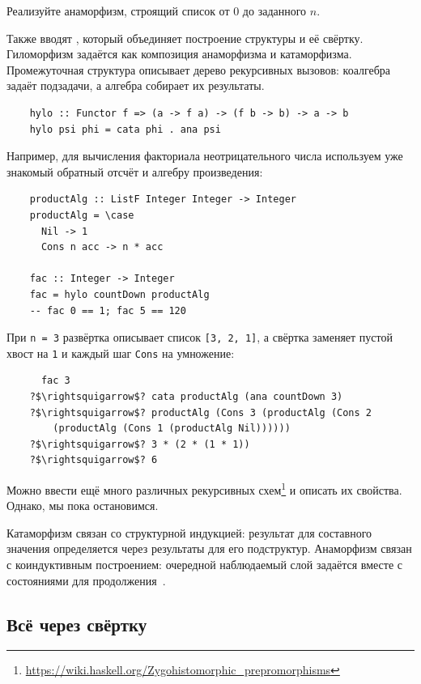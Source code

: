 \begin{task}
    Реализуйте анаморфизм, строящий список от $0$ до заданного $n$.
\end{task}

Также вводят , который объединяет построение структуры и её свёртку.
Гиломорфизм задаётся как композиция анаморфизма и катаморфизма.
Промежуточная структура описывает дерево рекурсивных вызовов: коалгебра задаёт подзадачи, а алгебра собирает их результаты.
\begin{verbatim}
    hylo :: Functor f => (a -> f a) -> (f b -> b) -> a -> b
    hylo psi phi = cata phi . ana psi
\end{verbatim}

Например, для вычисления факториала неотрицательного числа используем уже знакомый обратный отсчёт и алгебру произведения:
\begin{verbatim}
    productAlg :: ListF Integer Integer -> Integer
    productAlg = \case
      Nil -> 1
      Cons n acc -> n * acc

    fac :: Integer -> Integer
    fac = hylo countDown productAlg
    -- fac 0 == 1; fac 5 == 120
\end{verbatim}
При \texttt{n = 3} развёртка описывает список \texttt{[3, 2, 1]}, а свёртка заменяет пустой хвост на \texttt{1} и каждый шаг \texttt{Cons} на умножение:
\begin{verbatim}
      fac 3
    ?$\rightsquigarrow$? cata productAlg (ana countDown 3)
    ?$\rightsquigarrow$? productAlg (Cons 3 (productAlg (Cons 2
        (productAlg (Cons 1 (productAlg Nil))))))
    ?$\rightsquigarrow$? 3 * (2 * (1 * 1))
    ?$\rightsquigarrow$? 6
\end{verbatim}

Можно ввести ещё много различных рекурсивных схем\footnote{\url{https://wiki.haskell.org/Zygohistomorphic_prepromorphisms}} и описать их свойства.
Однако, мы пока остановимся.

Катаморфизм связан со структурной индукцией: результат для составного значения определяется через результаты для его подструктур.
Анаморфизм связан с коиндуктивным построением: очередной наблюдаемый слой задаётся вместе с состояниями для продолжения~\cite[глава 21]{pierce2002types}.

\subsection{Всё через свёртку} \label{subsec:all-folds}

